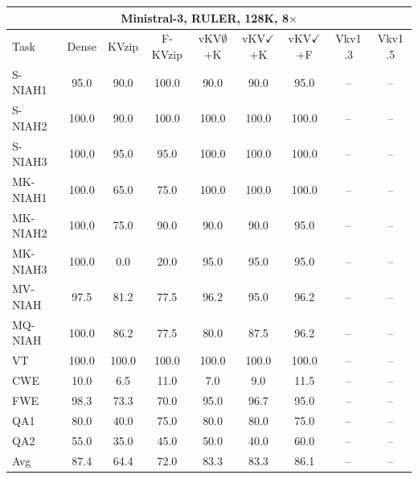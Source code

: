 \begin{tabular}{lcccccccc}
\toprule
\multicolumn{9}{c}{Ministral-3, RULER, 128K, 8$\times$} \\
\midrule
Task & Dense & KVzip & F-KVzip & vKV$\emptyset$+K & vKV$\checkmark$+K & vKV$\checkmark$+F & Vkv1 .3 & Vkv1 .5 \\
\midrule
S-NIAH1 & 95.0 & 90.0 & 100.0 & 90.0 & 90.0 & 95.0 & -- & -- \\
S-NIAH2 & 100.0 & 90.0 & 100.0 & 100.0 & 100.0 & 100.0 & -- & -- \\
S-NIAH3 & 100.0 & 95.0 & 95.0 & 100.0 & 100.0 & 100.0 & -- & -- \\
MK-NIAH1 & 100.0 & 65.0 & 75.0 & 100.0 & 100.0 & 100.0 & -- & -- \\
MK-NIAH2 & 100.0 & 75.0 & 90.0 & 90.0 & 90.0 & 95.0 & -- & -- \\
MK-NIAH3 & 100.0 & 0.0 & 20.0 & 95.0 & 95.0 & 95.0 & -- & -- \\
MV-NIAH & 97.5 & 81.2 & 77.5 & 96.2 & 95.0 & 96.2 & -- & -- \\
MQ-NIAH & 100.0 & 86.2 & 77.5 & 80.0 & 87.5 & 96.2 & -- & -- \\
VT & 100.0 & 100.0 & 100.0 & 100.0 & 100.0 & 100.0 & -- & -- \\
CWE & 10.0 & 6.5 & 11.0 & 7.0 & 9.0 & 11.5 & -- & -- \\
FWE & 98.3 & 73.3 & 70.0 & 95.0 & 96.7 & 95.0 & -- & -- \\
QA1 & 80.0 & 40.0 & 75.0 & 80.0 & 80.0 & 75.0 & -- & -- \\
QA2 & 55.0 & 35.0 & 45.0 & 50.0 & 40.0 & 60.0 & -- & -- \\
\midrule
Avg & 87.4 & 64.4 & 72.0 & 83.3 & 83.3 & 86.1 & -- & -- \\
\bottomrule
\end{tabular}
\vspace{0.8em}

